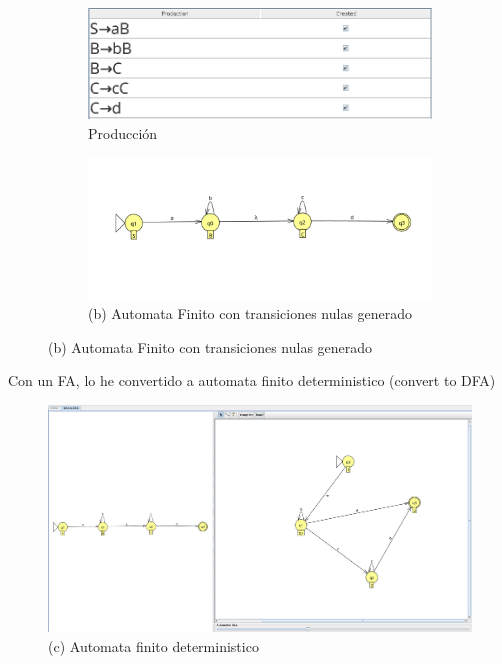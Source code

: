 \documentclass{article}
\begin{document}
            \begin{figure}[!h] 
            \centering
                \centering
                \begin{subfigure}[b]{0.55\textwidth}
                    \centering
                    \includegraphics[width=\textwidth]{./Imagenes/image10.png}
                    \caption{Producción}
                    \label{fig:label1}
                \end{subfigure}
                \hfill
                \begin{subfigure}[b]{1.05\textwidth}
                    \centering
                    \includegraphics[width=\textwidth]{./Imagenes/image9.png}
                    \caption*{ (b) Automata Finito con transiciones nulas generado}
                    \label{fig:label2}
                \end{subfigure}
                \vspace{0.5cm} 
            \end{figure}
        
        Con un FA, lo he convertido a automata finito deterministico (convert to DFA)
        \begin{figure}[!h]
            \centering
            \includegraphics[width=1\textwidth]{./Imagenes/image11.png}
            \caption*{(c) Automata finito deterministico}
            \label{fig:label4}
        \end{figure}
\end{document}
